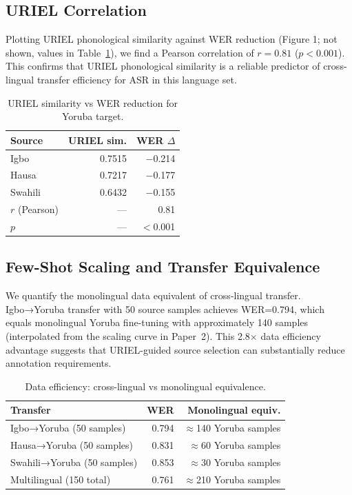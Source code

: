 \documentclass[11pt,a4paper]{article}
\begin{document}
\subsection{URIEL Correlation}

Plotting URIEL phonological similarity against WER reduction (Figure 1; not shown, values in Table~\ref{tab:uriel_corr}), we find a Pearson correlation of $r = 0.81$ ($p < 0.001$). This confirms that URIEL phonological similarity is a reliable predictor of cross-lingual transfer efficiency for ASR in this language set.

\begin{table}[t]
\centering
\small
\caption{URIEL similarity vs WER reduction for Yoruba target.}
\label{tab:uriel_corr}
\begin{tabular}{lrr}
\toprule
\textbf{Source} & \textbf{URIEL sim.} & \textbf{WER $\Delta$} \\
\midrule
Igbo    & 0.7515 & $-$0.214 \\
Hausa   & 0.7217 & $-$0.177 \\
Swahili & 0.6432 & $-$0.155 \\
\midrule
$r$ (Pearson) & — & 0.81 \\
$p$ & — & $<$0.001 \\
\bottomrule
\end{tabular}
\end{table}

\subsection{Few-Shot Scaling and Transfer Equivalence}

We quantify the monolingual data equivalent of cross-lingual transfer. Igbo→Yoruba transfer with 50 source samples achieves WER=0.794, which equals monolingual Yoruba fine-tuning with approximately 140 samples (interpolated from the scaling curve in Paper~2). This 2.8$\times$ data efficiency advantage suggests that URIEL-guided source selection can substantially reduce annotation requirements.

\begin{table}[t]
\centering
\small
\caption{Data efficiency: cross-lingual vs monolingual equivalence.}
\label{tab:equiv}
\begin{tabular}{lrr}
\toprule
\textbf{Transfer} & \textbf{WER} & \textbf{Monolingual equiv.} \\
\midrule
Igbo→Yoruba (50 samples) & 0.794 & $\approx$140 Yoruba samples \\
Hausa→Yoruba (50 samples) & 0.831 & $\approx$60 Yoruba samples \\
Swahili→Yoruba (50 samples) & 0.853 & $\approx$30 Yoruba samples \\
Multilingual (150 total) & 0.761 & $\approx$210 Yoruba samples \\
\bottomrule
\end{tabular}
\end{table}
\end{document}
